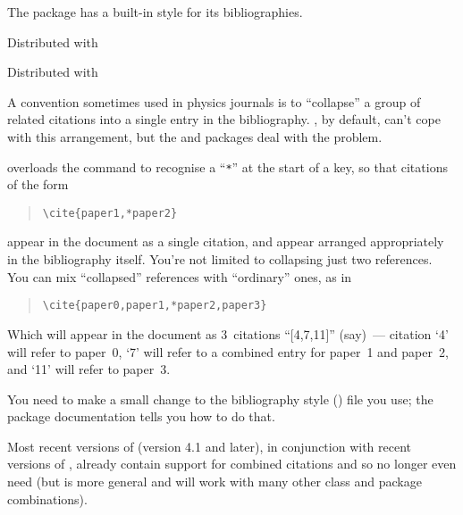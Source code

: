 The package  has a built-in style
 for its bibliographies.
\begin{ctanrefs}
\item[biblatex.sty]
\item[cite.sty]
\item[hypernat.sty]
\item[hyperref.sty]
\item[plainnat.bst]Distributed with 
\item[unsrtnat.bst]Distributed with 
\end{ctanrefs}


A convention sometimes used in physics journals is to ``collapse'' a group of
related citations into a single entry in the bibliography.  \BibTeX{},
by default, can't cope with this arrangement, but the 
and  packages deal with the problem.

 overloads the  command to recognise a
``\texttt{*}'' at the start of a key, so that citations of the form
\begin{quote}
\begin{verbatim}
\cite{paper1,*paper2}
\end{verbatim}
\end{quote}
appear in the document as a single citation, and appear arranged
appropriately in the bibliography itself.  You're not limited to
collapsing just two references.  You can mix ``collapsed'' references
with ``ordinary'' ones, as in
\begin{quote}
\begin{verbatim}
\cite{paper0,paper1,*paper2,paper3}
\end{verbatim}
\end{quote}
Which will appear in the document as 3~citations ``[4,7,11]''
(say)~--- citation `4' will refer to paper~0, `7' will refer to a
combined entry for paper~1 and paper~2, and `11' will refer to
paper~3.

You need to make a small change to the bibliography style
() file you use; the  package
documentation tells you how to do that.

Most recent versions of  (version 4.1 and later), in
conjunction with recent versions of , already contain
support for combined citations and so no longer even need
 (but  is more general and will
work with many other class and package combinations).


